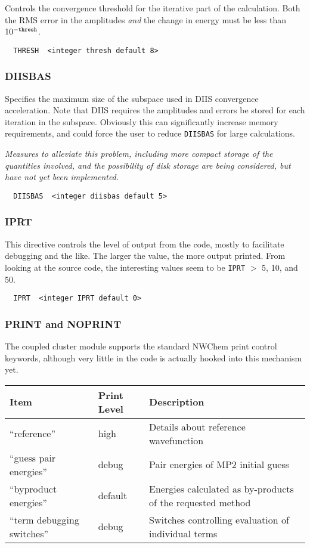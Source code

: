 Controls the convergence threshold for the iterative part of the
calculation.  Both the RMS error in the amplitudes {\em and} the
change in energy must be less than $10^{-{\tt thresh}}$.

\begin{verbatim}
  THRESH  <integer thresh default 8>
\end{verbatim}

\subsubsection{DIISBAS}

Specifies the maximum size of the subspace used in DIIS convergence
acceleration.  Note that DIIS requires the amplitudes and errors be
stored for each iteration in the subspace.  Obviously this can
significantly increase memory requirements, and could force the user
to reduce \verb+DIISBAS+ for large calculations.

{\em Measures to alleviate this problem, including more compact
storage of the quantities involved, and the possibility of disk
storage are being considered, but have not yet been implemented.}

\begin{verbatim}
  DIISBAS  <integer diisbas default 5>
\end{verbatim}

\subsubsection{IPRT}

This directive controls the level of output from the code, mostly to
facilitate debugging and the like.  The larger the value, the more
output printed.  From looking at the source code, the interesting
values seem to be \verb+IPRT+ $>$ 5, 10, and 50.

\begin{verbatim}
  IPRT  <integer IPRT default 0>
\end{verbatim}

\subsubsection{PRINT and NOPRINT}

The coupled cluster module supports the standard NWChem print control
keywords, although very little in the code is actually hooked into
this mechanism yet.

\begin{tabular}{lll}
\hline\hline
Item                    & Print Level   & Description \\
\hline
``reference''             & high          & Details about reference wavefunction\\
``guess pair energies'' & debug & Pair energies of MP2 initial guess\\
``byproduct energies'' & default & Energies calculated as by-products
of the requested method \\
``term debugging switches'' & debug & Switches controlling evaluation
of individual terms \\
\hline\hline
\end{tabular}


